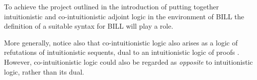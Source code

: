 To achieve the project outlined in the introduction of putting
together intuitionistic and co-intuitionistic adjoint logic in the
environment of BILL the definition of a suitable syntax for BILL will
play a role.

More generally, notice also that co-intuitionistic logic also arises
as a logic of refutations of intuitionistic sequents, dual to an
intuitionistic logic of proofs \cite{Tranchini}.  However,
co-intuitionistic logic could also be regarded as \emph{opposite} to
intuitionistic logic, rather than its dual.


